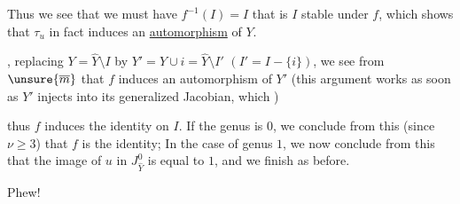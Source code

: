 

 Thus we see that we must have $f^{-1}(I)=I$ that is $I$ stable under $f$, which shows that $\tau_u$ in fact induces an \uline{automorphism} of $Y$.


, replacing $Y=\widehat Y\setminus I$ by $Y'=Y\cup i=\widehat Y\setminus I'$ $(I'=I-\{i\})$, we see from $\unsure{\overline m}$ that $f$ induces an automorphism of $Y'$ (this argument works as soon as $Y'$ injects into its generalized Jacobian, which  )

 thus $f$ induces the identity on $I$. If the genus is $0$, we conclude from this (since $\nu\geq3$) that $f$ is the identity;  In the case of genus $1$, we now conclude from this that the image of $u$ in $J_{\widehat Y}^0$ is equal to $1$, and we finish as before.

Phew!
